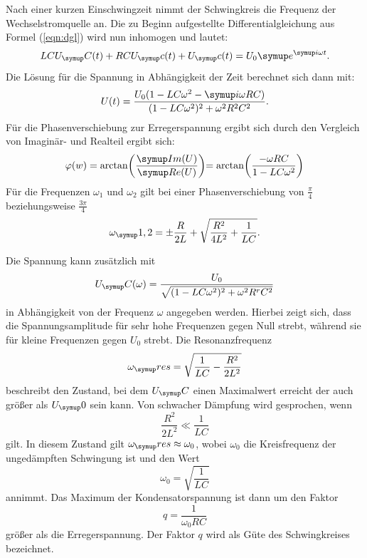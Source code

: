Nach einer kurzen Einschwingzeit nimmt der Schwingkreis die Frequenz der
Wechselstromquelle an. Die zu Beginn aufgestellte Differentialgleichung aus
Formel (\ref{eqn:dgl}) wird nun inhomogen und lautet:
\begin{equation}
  LCU_\su{C}(t) + RCU_\su{c}(t) + U_\su{c}(t) =U_0\su{e}^{\su{i}\omega t}.
  \label{eqn:inh}
\end{equation}
Die Lösung für die Spannung in Abhängigkeit der Zeit berechnet sich dann mit:
\begin{equation}
  U(t)=\frac{U_0(1-LC\omega^2-\su{i}\omega RC)}{(1-LC\omega^2)^2+\omega^2 R^2 C^2}.
\end{equation}
Für die Phasenverschiebung zur Erregerspannung ergibt sich durch den Vergleich
von Imaginär- und Realteil ergibt sich: %
\begin{equation}
  \varphi(w)=\arctan\biggr(\frac{\su{Im}(U)}{\su{Re}(U)}\biggl)
  =\arctan\biggr(\frac{-\omega RC}{1-LC\omega^2}\biggl)
\end{equation}
Für die Frequenzen $\omega_1$ und $\omega_2$ gilt bei einer Phasenverschiebung
von $\frac{\pi}{4}$ beziehungsweise $\frac{3\pi}{4}$
\begin{equation}
  \omega_\su{1,2}=\pm\frac{R}{2L}+\sqrt{\frac{R^2}{4L^2}+\frac{1}{LC}}.
\end{equation}

Die Spannung kann zusätzlich mit
\begin{equation}
  U_\su{C}(\omega)=\frac{U_0}{\sqrt{(1-LC\omega^2)^2+\omega^2R^rC^2}}
\end{equation}
in Abhängigkeit von der Frequenz $\omega$ angegeben werden.
Hierbei zeigt sich, dass die Spannungsamplitude für sehr hohe Frequenzen gegen
Null strebt, während sie für kleine Frequenzen gegen $U_0$ strebt.
Die Resonanzfrequenz
\begin{equation}
  \omega_\su{res}=\sqrt{\frac{1}{LC}-\frac{R^2}{2L^2}}
\end{equation}
beschreibt den Zustand, bei dem $U_\su{C}$ einen Maximalwert erreicht der auch
größer als $U_\su{0}$ sein kann.
Von schwacher Dämpfung wird gesprochen, wenn
\begin{equation}
  \frac{R^2}{2L^2} \ll \frac{1}{LC}
\end{equation}
gilt. In diesem Zustand gilt $\omega_\su{res}\approx\omega_0$, wobei $\omega_0$
die Kreisfrequenz der ungedämpften Schwingung ist und den Wert
\begin{equation}
  \omega_0 =\sqrt{\frac{1}{LC}}
\end{equation}
annimmt. Das Maximum der Kondensatorspannung ist dann um den Faktor
\begin{equation}
  q=\frac{1}{\omega_0RC}
\end{equation}
größer als die Erregerspannung. Der Faktor $q$ wird als Güte des Schwingkreises
bezeichnet.
